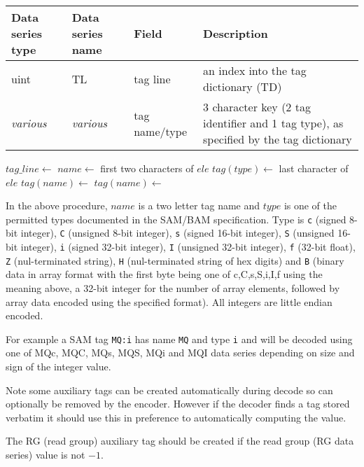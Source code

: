 \documentclass[a4paper]{article}
\begin{document}
\begin{tabular}{|>{\raggedright}p{70pt}|>{\raggedright}p{75pt}|>{\raggedright}p{90pt}|>{\raggedright}p{200pt}|}
\hline
\textbf{Data series type} & \textbf{Data series name} & \textbf{Field} & \textbf{Description}\tabularnewline
\hline
uint & TL & tag line & an index into the tag dictionary (TD)\tabularnewline
\hline
\textit{various} & \textit{various} & tag name/type & 3 character key (2 tag identifier and 1 tag type), as specified by the tag dictionary\tabularnewline
\hline
\end{tabular}

\vskip 20pt
\begin{algorithmic}[1]
\State $tag\_line\gets$ 
  \State $name\gets$ first two characters of $ele$
  \State $tag(type)\gets$ last character of $ele$
  \State $tag(name)\gets$ 
  \Else
  \State $tag(name)\gets$ 
  \EndIf
\EndFor
\EndProcedure
\end{algorithmic}

In the above procedure, $name$ is a two letter tag name and $type$ is one of the permitted types documented in the SAM/BAM specification.
Type is \texttt{c} (signed 8-bit integer), \texttt{C} (unsigned 8-bit integer), \texttt{s} (signed 16-bit integer), \texttt{S} (unsigned 16-bit integer), \texttt{i} (signed 32-bit integer), \texttt{I} (unsigned 32-bit integer), \texttt{f} (32-bit float), \texttt{Z} (nul-terminated string), \texttt{H} (nul-terminated string of hex digits) and \texttt{B} (binary data in array format with the first byte being one of c,C,s,S,i,I,f using the meaning above, a 32-bit integer for the number of array elements, followed by array data encoded using the specified format).  All integers are little endian encoded.

For example a SAM tag \texttt{MQ:i} has name \texttt{MQ} and type \texttt{i} and will be decoded using one of MQc, MQC, MQs, MQS, MQi and MQI data series depending on size and sign of the integer value.

Note some auxiliary tags can be created automatically during decode so can optionally be removed by the encoder.
However if the decoder finds a tag stored verbatim it should use this in preference to automatically computing the value.

The RG (read group) auxiliary tag should be created if the read group (RG data series) value is not $-1$.
\end{document}

